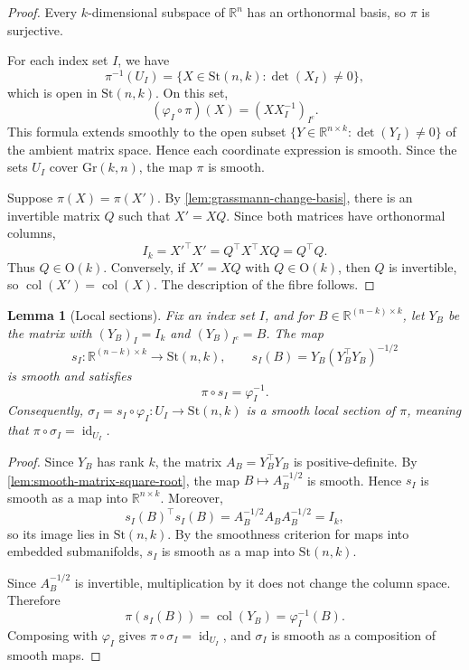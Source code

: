 \documentclass[12pt]{article}
\theoremstyle{definition}
\theoremstyle{plain}
\newtheorem{lemma}[definition]{Lemma}
\theoremstyle{remark}
\newcommand{\R}{\mathbb{R}}
\newcommand{\St}{\mathrm{St} (n,k)}
\newcommand{\Gr}{\mathrm{Gr} (k,n)}
\newcommand{\Orth}{\mathrm{O}}               %
\DeclareMathOperator{\col}{col}              %
\DeclareMathOperator{\id}{id}                %
\begin{document}
\begin{proof}
  Every \( k \)-dimensional subspace of \( \R^n \) has an orthonormal basis, so \( \pi \) is surjective.

  For each index set \( I \), we have
  \[
    \pi^{-1}(U_I)=\{X\in\St:\det(X_I)\ne0\},
  \]
  which is open in \( \St \).
  On this set,
  \[
    (\varphi_I\circ\pi)(X)=(XX_I^{-1})_{I^c}.
  \]
  This formula extends smoothly to the open subset \( \{Y\in\R^{n\times k}:\det(Y_I)\ne0\} \) of the ambient matrix space.
  Hence each coordinate expression is smooth.
  Since the sets \( U_I \) cover \( \Gr \), the map \( \pi \) is smooth.

  Suppose \( \pi(X)=\pi(X') \).
  By \cref{lem:grassmann-change-basis}, there is an invertible matrix \( Q \) such that \( X'=XQ \).
  Since both matrices have orthonormal columns,
  \[
    I_k=X'^\top X'=Q^\top X^\top XQ=Q^\top Q.
  \]
  Thus \( Q\in\Orth(k) \).
  Conversely, if \( X'=XQ \) with \( Q\in\Orth(k) \), then \( Q \) is invertible, so \( \col(X')=\col(X) \).
  The description of the fibre follows.
\end{proof}

\begin{lemma}[Local sections]\label{lem:grassmann-local-sections}
  Fix an index set \( I \), and for \( B \in \R^{(n-k)\times k} \), let \( Y_B \) be the matrix with \( (Y_B)_I=I_k \) and \( (Y_B)_{I^c}=B \).
  The map
  \[
    s_I : \R^{(n-k)\times k} \longrightarrow \St, \qquad s_I(B)=Y_B(Y_B^\top Y_B)^{-1/2}
  \]
  is smooth and satisfies
  \[
    \pi\circ s_I=\varphi_I^{-1}.
  \]
  Consequently, \( \sigma_I=s_I\circ\varphi_I : U_I\longrightarrow\St \) is a smooth local section of \( \pi \), meaning that \( \pi\circ\sigma_I=\id_{U_I} \).
\end{lemma}

\begin{proof}
  Since \( Y_B \) has rank \( k \), the matrix \( A_B=Y_B^\top Y_B \) is positive-definite.
  By \cref{lem:smooth-matrix-square-root}, the map \( B\mapsto A_B^{-1/2} \) is smooth.
  Hence \( s_I \) is smooth as a map into \( \R^{n\times k} \).
  Moreover,
  \[
    s_I(B)^\top s_I(B)=A_B^{-1/2}A_BA_B^{-1/2}=I_k,
  \]
  so its image lies in \( \St \).
  By the smoothness criterion for maps into embedded submanifolds, \( s_I \) is smooth as a map into \( \St \).

  Since \( A_B^{-1/2} \) is invertible, multiplication by it does not change the column space.
  Therefore
  \[
    \pi(s_I(B))=\col(Y_B)=\varphi_I^{-1}(B).
  \]
  Composing with \( \varphi_I \) gives \( \pi\circ\sigma_I=\id_{U_I} \), and \( \sigma_I \) is smooth as a composition of smooth maps.
\end{proof}
\end{document}
